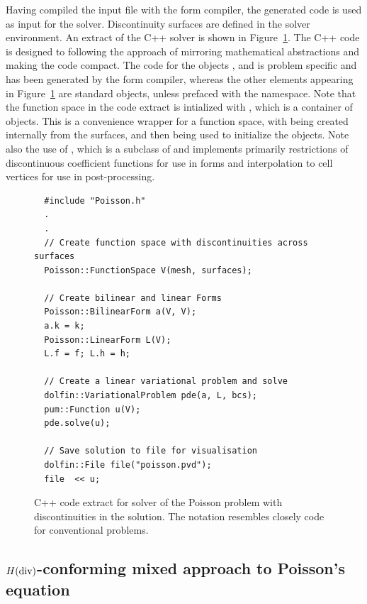 %
Having compiled the input file with the form compiler, the generated code
is used as input for the solver. Discontinuity surfaces are defined
in the solver environment.  An extract of the C++ solver is shown in
Figure~\ref{nikbakht:fig:poisson_c++}.  The C++ code is designed to following the
{\dolfin} approach of mirroring mathematical abstractions and making the
code compact.  The code for the objects ,
 and  is problem
specific and has been generated by the form compiler, whereas the other
elements appearing in Figure~\ref{nikbakht:fig:poisson_c++} are standard {\dolfin}
objects, unless prefaced with the  namespace. Note that the
function space in the code extract is intialized with ,
which is a container of  objects. This is a
convenience wrapper for a \ufc{} function space, with 
being created internally from the surfaces, and then being used to
initialize the \ufc{} objects.  Note also the use of ,
which is a subclass of  and implements primarily
restrictions of discontinuous coefficient functions for use in forms
and interpolation to cell vertices for use in post-processing.
%
\begin{figure} \footnotesize
\begin{verbatim}
  #include "Poisson.h"
  .
  .
  // Create function space with discontinuities across surfaces
  Poisson::FunctionSpace V(mesh, surfaces);

  // Create bilinear and linear Forms
  Poisson::BilinearForm a(V, V);
  a.k = k;
  Poisson::LinearForm L(V);
  L.f = f; L.h = h;

  // Create a linear variational problem and solve
  dolfin::VariationalProblem pde(a, L, bcs);
  pum::Function u(V);
  pde.solve(u);

  // Save solution to file for visualisation
  dolfin::File file("poisson.pvd");
  file  << u;
\end{verbatim}
\caption{C++ code extract for solver of the Poisson problem with discontinuities in the
solution. The notation resembles closely \dolfin{} code for conventional problems.}
\label{nikbakht:fig:poisson_c++}
\end{figure}
%
\subsection{$H(\rm div)$-conforming mixed approach to Poisson's equation}

